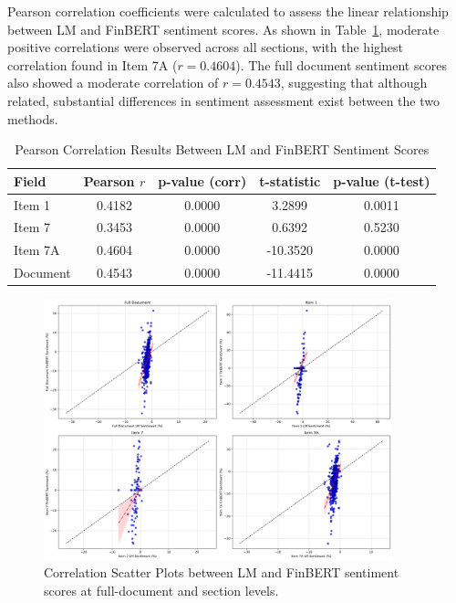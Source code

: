 \documentclass[12pt]{article}
\begin{document}
Pearson correlation coefficients were calculated to assess the linear relationship between LM and FinBERT sentiment scores. As shown in Table~\ref{tab:correlation_results}, moderate positive correlations were observed across all sections, with the highest correlation found in Item 7A ($r = 0.4604$). The full document sentiment scores also showed a moderate correlation of $r = 0.4543$, suggesting that although related, substantial differences in sentiment assessment exist between the two methods.

\begin{table}[H]
\centering
\caption{Pearson Correlation Results Between LM and FinBERT Sentiment Scores}
\label{tab:correlation_results}
\begin{tabular}{lcccc}
\hline
Field & Pearson $r$ & p-value (corr) & t-statistic & p-value (t-test) \\
\hline
Item 1 & 0.4182 & 0.0000 & 3.2899 & 0.0011 \\
Item 7 & 0.3453 & 0.0000 & 0.6392 & 0.5230 \\
Item 7A & 0.4604 & 0.0000 & -10.3520 & 0.0000 \\
Document & 0.4543 & 0.0000 & -11.4415 & 0.0000 \\
\hline
\end{tabular}
\end{table}

\begin{figure}[H]
\centering
\includegraphics[width=0.9\textwidth]{figures/correlation_scatter_full_and_sections.png}
\caption{Correlation Scatter Plots between LM and FinBERT sentiment scores at full-document and section levels.}
\label{fig:scatter_all}
\end{figure}
\end{document}
